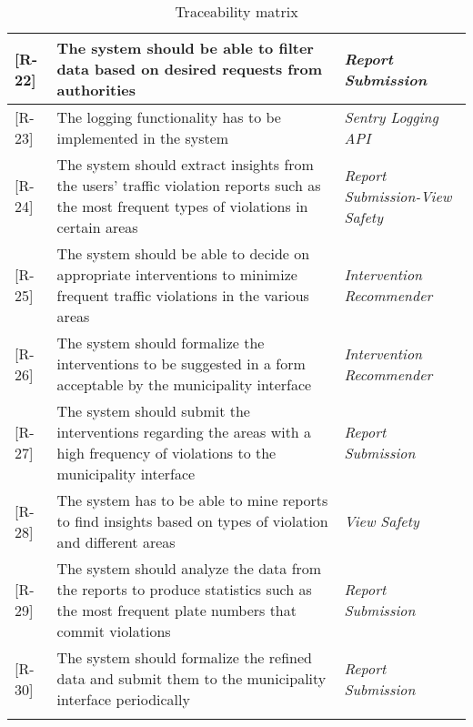 \begin{longtable}{| p{} |p{} | p{} |}
 [R-22] & The system should be able to filter data based on desired requests from authorities & \emph{Report Submission} 		\\ \hline

 [R-23] & The logging functionality has to be implemented in the system & \emph{Sentry Logging API} 		\\ \hline

 [R-24] &  The system should extract insights from the users’ traffic violation reports such as the most frequent types of violations in certain areas & \emph{Report Submission-View Safety} 		\\ \hline

 [R-25] & The system should be able to decide on appropriate interventions to minimize frequent traffic violations in the various areas
 & \emph{Intervention Recommender} 		\\ \hline

 [R-26] & The system should formalize the interventions to be suggested in a form acceptable by the municipality interface & \emph{Intervention Recommender} 		\\ \hline

 [R-27] & The system should submit the interventions regarding the areas with a high frequency of violations to the municipality interface & \emph{Report Submission} 		\\ \hline

 [R-28] & The system has to be able to mine reports to find insights based on types of violation and different areas & \emph{View Safety} 		\\ \hline

 [R-29] & The system should analyze the data from the reports to produce statistics such as the most frequent plate numbers that commit violations & \emph{Report Submission} 		\\ \hline

 [R-30] & The system should formalize the refined data and submit them to the municipality interface periodically & \emph{Report Submission} 		 \\ \hline

\caption{Traceability matrix}
\label{tab:traceability-matrix}
\end{longtable}

